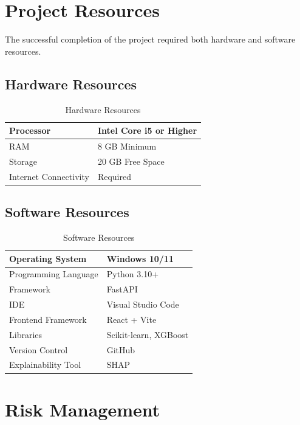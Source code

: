 \documentclass[12pt]{report}
\begin{document}
\section{Project Resources}

The successful completion of the project required both hardware and software resources.

\subsection{Hardware Resources}

\begin{table}[H]
\centering
\caption{Hardware Resources}
\begin{tabular}{|l|l|}
\hline
Processor & Intel Core i5 or Higher \\
\hline
RAM & 8 GB Minimum \\
\hline
Storage & 20 GB Free Space \\
\hline
Internet Connectivity & Required \\
\hline
\end{tabular}
\end{table}

\subsection{Software Resources}

\begin{table}[H]
\centering
\caption{Software Resources}
\begin{tabular}{|l|l|}
\hline
Operating System & Windows 10/11 \\
\hline
Programming Language & Python 3.10+ \\
\hline
Framework & FastAPI \\
\hline
IDE & Visual Studio Code \\
\hline
Frontend Framework & React + Vite \\
\hline
Libraries & Scikit-learn, XGBoost \\
\hline
Version Control & GitHub \\
\hline
Explainability Tool & SHAP \\
\hline
\end{tabular}
\end{table}

\section{Risk Management}
\end{document}
